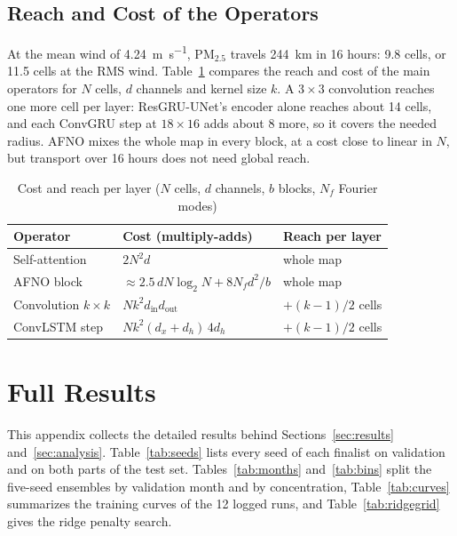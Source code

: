 \documentclass[journal]{IEEEtran}
\newcommand{\PM}{PM$_{2.5}$}
\begin{document}
\subsection{Reach and Cost of the Operators}
At the mean wind of 4.24~\si{\metre\per\second}, \PM{} travels 244~km in 16 hours: 9.8 cells, or 11.5 cells at the RMS wind. Table~\ref{tab:opcost} compares the reach and cost of the main operators for $N$ cells, $d$ channels and kernel size $k$. A $3\times3$ convolution reaches one more cell per layer: ResGRU-UNet's encoder alone reaches about 14 cells, and each ConvGRU step at $18\times16$ adds about 8 more, so it covers the needed radius. AFNO mixes the whole map in every block, at a cost close to linear in $N$, but transport over 16 hours does not need global reach.

\begin{table}[H]
\centering
\caption{Cost and reach per layer ($N$ cells, $d$ channels, $b$ blocks, $N_f$ Fourier modes)}
\label{tab:opcost}
\setlength{\tabcolsep}{4pt}
\begin{tabular}{@{}lll@{}}
\toprule
Operator & Cost (multiply-adds) & Reach per layer \\
\midrule
Self-attention & $2N^2d$ & whole map \\
AFNO block & $\approx 2.5\,dN\log_2N + 8N_fd^2/b$ & whole map \\
Convolution $k\times k$ & $Nk^2d_{\text{in}}d_{\text{out}}$ & $+(k-1)/2$ cells \\
ConvLSTM step & $Nk^2(d_x+d_h)\,4d_h$ & $+(k-1)/2$ cells \\
\bottomrule
\end{tabular}
\end{table}

\FloatBarrier
\section{Full Results}
\label{app:regfull}\label{app:tests}\label{app:checks}\label{app:extra}\label{app:supp}

This appendix collects the detailed results behind Sections~\ref{sec:results} and~\ref{sec:analysis}. Table~\ref{tab:seeds} lists every seed of each finalist on validation and on both parts of the test set. Tables~\ref{tab:months} and~\ref{tab:bins} split the five-seed ensembles by validation month and by concentration, Table~\ref{tab:curves} summarizes the training curves of the 12 logged runs, and Table~\ref{tab:ridgegrid} gives the ridge penalty search.
\end{document}
